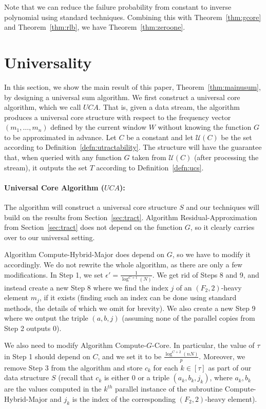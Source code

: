 \documentclass[11pt]{article}
\begin{document}
\noindent Note that we can reduce the failure probability from constant to inverse polynomial using standard techniques.
Combining this with Theorem~\ref{thm:gcore} and Theorem~\ref{thm:rlb}, we have Theorem~\ref{thm:zeroone}.

\section{Universality}\label{sec:universality}

In this section, we show the main result of this paper, Theorem~\ref{thm:mainusum},
by designing a universal sum algorithm.  We first construct a universal core algorithm, which we call $UCA$.
That is, given a data stream,
the algorithm produces a universal core structure with respect to the frequency vector $(m_1,\ldots,m_n)$
defined by the current window $W$ without knowing the function $G$ to be approximated in advance.  Let
$C$ be a constant and let $\mathcal{U}(C)$ be the set according to Definition~\ref{defn:utractability}.
The structure will have the guarantee that, when queried with any function $G$ taken from $\mathcal{U}(C)$ (after
processing the stream), it outputs the set $T$ according to Definition~\ref{defn:ucs}.


\paragraph{Universal Core Algorithm ($UCA$):} The algorithm will construct a universal core structure
$S$ and our techniques will build on the results from Section~\ref{sec:tract}.
Algorithm Residual-Approximation from Section~\ref{sec:tract} does not depend on the function $G$,
so it clearly carries over to our universal setting.

Algorithm Compute-Hybrid-Major does depend on $G$, so we have to modify it accordingly.
We do not rewrite the whole algorithm, as there are only a few modifications.  In Step 1,
we set $\epsilon' = \frac{1}{\log^{C+1}(N)}$.  We get rid of Steps 8 and 9, and instead create a new
Step 8 where we find the index $j$ of an $(F_2,2)$-heavy element $m_j$, if it exists (finding
such an index can be done using standard methods, the details of which we omit
for brevity).  We also create a new Step 9 where we output the triple $(a,b,j)$ (assuming none of the parallel
copies from Step 2 outputs 0).

We also need to modify Algorithm Compute-$G$-Core.  In particular, the value
of $\tau$ in Step 1 should depend on $C$, and we set it to be $\frac{\log^{C+2}(nN)}{p}$.  Moreover,
we remove Step 3 from the algorithm and store $c_k$ for each $k \in [\tau]$ as part of our
data structure $S$ (recall that $c_k$ is either 0 or a triple $(a_k,b_k,j_k)$, where $a_k,b_k$ are the values
computed in the $k^{th}$ parallel instance of the subroutine Compute-Hybrid-Major and $j_k$ is the index
of the corresponding $(F_2,2)$-heavy element).
\end{document}
